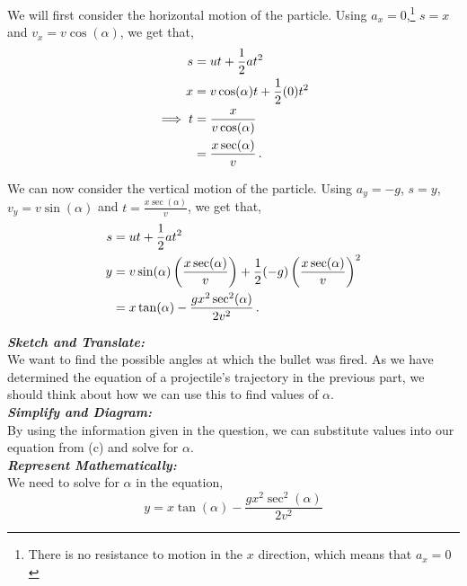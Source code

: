 \begin{subquestions}
We will first consider the horizontal motion of the particle. Using $a_x=0$,\footnote{There is no resistance to motion in the $x$ direction, which means that $a_x=0$} $s=x$ and $v_x=v\cos(\alpha)$, we get that,
\begin{align}
	s & = ut + \frac{1}{2}at^2 \nonumber \\
	x & = v\cos(\alpha)t + \frac{1}{2}(0)t^2 \nonumber \\
	\implies t & = \frac{x}{v\cos(\alpha)} \nonumber \\
	& = \frac{x\sec(\alpha)}{v} \,.
\end{align}	

We can now consider the vertical motion of the particle. Using $a_y=-g$, $s=y$, $v_y=v\sin(\alpha)$ and $t=\frac{x\sec(\alpha)}{v}$, we get that,
\begin{align}
	s & = ut + \frac{1}{2}at^2 \nonumber \\
	y & = v\sin(\alpha)\left(\frac{x\sec(\alpha)}{v}\right) + \frac{1}{2}(-g)\left(\frac{x\sec(\alpha)}{v}\right)^2 \nonumber \\
	& = x\tan(\alpha) - \frac{gx^2\sec^2(\alpha)}{2v^2} \,.
\end{align}


\subquestion

\textbf{\textit{Sketch and Translate:}} \\
We want to find the possible angles at which the bullet was fired. As we have determined the equation of a projectile's trajectory in the previous part, we should think about how we can use this to find values of $\alpha$. \\




\textbf{\textit{Simplify and Diagram:}} \\
By using the information given in the question, we can substitute values into our equation from (c) and solve for $\alpha$.\\




\textbf{\textit{Represent Mathematically:}} \\
We need to solve for $\alpha$ in the equation,
\begin{equation}
	y = x\tan(\alpha) - \frac{gx^2\sec^2(\alpha)}{2v^2}
\end{equation} 
    

\end{subquestions}
